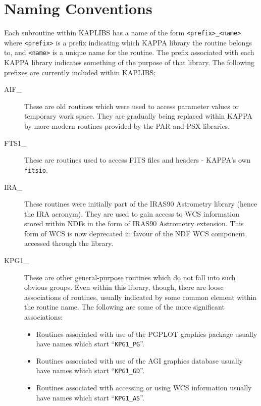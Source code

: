 \section{Naming Conventions}
Each subroutine within KAPLIBS has a name of the form {\tt <prefix>\_<name>}
where {\tt <prefix>} is a prefix indicating which KAPPA library the
routine belongs to, and {\tt <name>} is a unique name for the routine.
The prefix associated with each KAPPA library indicates something of the
purpose of that library. The following prefixes are currently included
within KAPLIBS:

\begin{description}

\item [AIF\_] These are old routines which were used to access parameter
values or temporary work space. They are gradually being replaced within
KAPPA by more modern routines provided by the PAR and PSX libraries.

\item [FTS1\_] These are routines used to access FITS files and headers -
KAPPA's own {\tt fitsio}.

\item [IRA\_] These routines were initially part of the IRAS90 Astrometry
library (hence the IRA acronym). They are used to gain access to WCS
information stored within NDFs in the form of IRAS90 Astrometry extension.
This form of WCS is now deprecated in favour of the NDF WCS component,
accessed through the  library.

\item [KPG1\_] These are other general-purpose routines which do not fall
into such obvious groups.  Even within this library, though, there are
loose associations of routines, usually indicated by some common element
within the routine name. The following are some of the more significant
associations:

\begin{itemize}
\item Routines associated with use of the PGPLOT graphics package usually
have names which start ``{\tt KPG1\_PG}''.
\item Routines associated with use of the AGI graphics database usually
have names which start ``{\tt KPG1\_GD}''.
\item Routines associated with accessing or using WCS information usually
have names which start ``{\tt KPG1\_AS}''.
\end{itemize}

\end{description}

